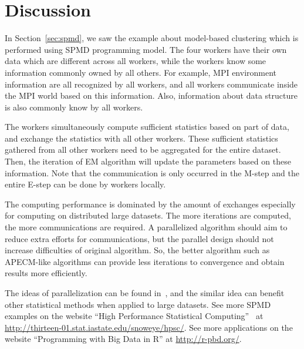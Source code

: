 \section[Discussion]{Discussion}
\label{sec:discussion}

In Section~\ref{sec:spmd}, we saw the example about model-based clustering
which is performed using SPMD programming model.
The four workers have their own data which are different across all workers,
while the workers know some information commonly owned by all others.
For example, MPI environment information are all recognized by all workers,
and all workers communicate inside the MPI world based on this information.
Also, information about data structure is also commonly know by all workers.

The workers simultaneously compute sufficient statistics based on part of data,
and exchange the statistics with all other workers.
These sufficient statistics gathered from all other workers
need to be aggregated for the entire dataset.
Then, the iteration of EM algorithm will update the parameters
based on these information.
Note that the communication is only occurred in the M-step and the
entire E-step can be done by workers locally.

The computing performance is dominated by the amount of exchanges especially
for computing on distributed large datasets.
The more iterations are computed, the more communications are required.
A parallelized algorithm should aim to reduce extra efforts for
communications, but the parallel design should not increase difficulties
of original algorithm.
So, the better algorithm such as APECM-like algorithms can provide
less iterations to convergence and obtain results more efficiently.

The ideas of parallelization can be found in~\citet{Chen2012a},
and the similar idea can benefit other statistical methods when
applied to large datasets.
See more SPMD examples on the website
``High Performance Statistical Computing''~\citep{hpsc2012} at
\url{http://thirteen-01.stat.iastate.edu/snoweye/hpsc/}.
See more applications on the website
``Programming with Big Data in R'' at
\url{http://r-pbd.org/}.
